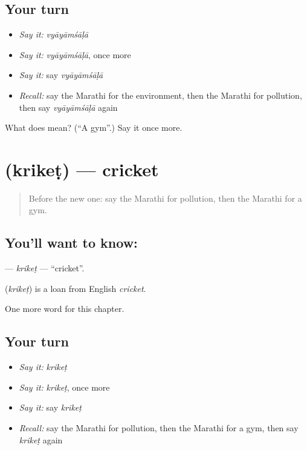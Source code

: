 \subsection*{Your turn}
\begin{itemize}
\raggedright
  \item \emph{Say it:} \emph{vyāyāmśāḷā}
  \item \emph{Say it:} \emph{vyāyāmśāḷā}, once more
  \item \emph{Say it:} say \emph{vyāyāmśāḷā}
  \item \emph{Recall:} say the Marathi for the environment, then the Marathi for pollution, then say \emph{vyāyāmśāḷā} again
\end{itemize}

\begin{tcolorbox}[breakable,colback=teal!4,colframe=teal!35!black,title={Before you move on}]
What does  mean? (\textquotedblleft{}A gym\textquotedblright{}.) Say it once more.
\end{tcolorbox}
\section[\texorpdfstring{\mr{क्रिकेट} (krikeṭ)}{क्रिकेट (krikeṭ)}]{ (krikeṭ) — cricket}

\label{lesson:MR-C185-kriket}



\begin{quote}
Before the new one: say the Marathi for pollution, then the Marathi for a gym.
\end{quote}

\subsection*{You'll want to know: }
\textbf{} — \emph{krikeṭ} — \textquotedblleft{}cricket\textquotedblright{}.

\begin{cousinweb}
\textbf{} (\emph{krikeṭ}) is a loan from English \emph{cricket}.
\end{cousinweb}

\begin{grammarlens}[title={What you've built}]
One more word for this chapter.
\end{grammarlens}

\subsection*{Your turn}
\begin{itemize}
\raggedright
  \item \emph{Say it:} \emph{krikeṭ}
  \item \emph{Say it:} \emph{krikeṭ}, once more
  \item \emph{Say it:} say \emph{krikeṭ}
  \item \emph{Recall:} say the Marathi for pollution, then the Marathi for a gym, then say \emph{krikeṭ} again
\end{itemize}

